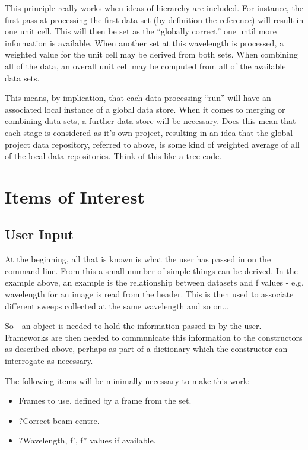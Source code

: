 \documentclass[a4paper, 11pt]{article}
\begin{document}
This principle really works when ideas of hierarchy are included. For instance,
the first pass at processing the first data set (by definition the reference)
will result in one unit cell. This will then be set as the ``globally 
correct'' one until more information is available. When another set at this
wavelength is processed, a weighted value for the unit cell may be derived
from both sets. When combining all of the data, an overall unit cell may be 
computed from all of the available data sets. 

This means, by implication, that each data processing ``run'' will have
an associated local instance of a global data store. When it comes to 
merging or combining data sets, a further data store will be necessary.
Does this mean that each stage is considered as it's own project, resulting
in an idea that the global project data repository, referred to above, is
some kind of weighted average of all of the local data repositories. Think
of this like a tree-code.

\section{Items of Interest}

\subsection{User Input}

At the beginning, all that is known is what the user has passed in on the 
command line. From this a small number of simple things can be derived. 
In the example above, an example is the relationship between datasets and
f values - e.g. wavelength for an image is read from the header. This is
then used to associate different sweeps collected at the same wavelength 
and so on...

So - an object is needed to hold the information passed in by the user.
Frameworks are then needed to communicate this information to the constructors
as described above, perhaps as part of a dictionary which the constructor
can interrogate as necessary.

The following items will be minimally necessary to make this work:

\begin{itemize}
\item{Frames to use, defined by a frame from the set.}
\item{?Correct beam centre.}
\item{?Wavelength, f', f'' values if available.}
\end{itemize}
\end{document}
